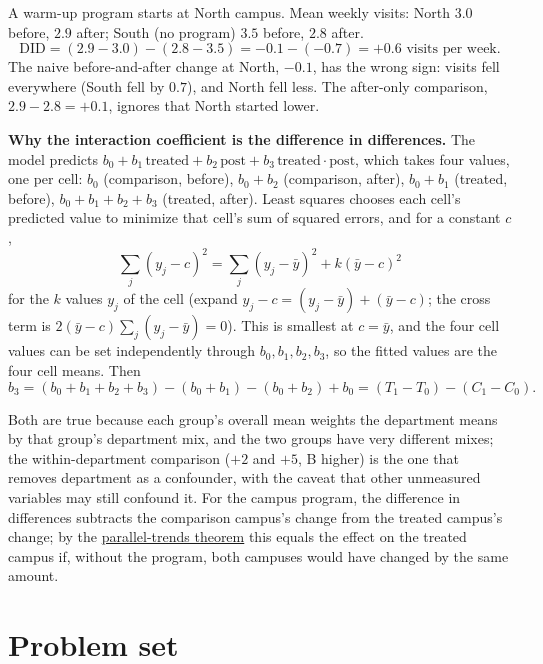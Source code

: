 \documentclass[10pt]{scrartcl}
\begin{document}
\begin{example*}
A warm-up program starts at North campus. Mean weekly visits: North $3.0$ before, $2.9$ after; South (no program) $3.5$ before, $2.8$ after.
\[
  \text{DID} = (2.9 - 3.0) - (2.8 - 3.5) = -0.1 - (-0.7) = +0.6 \text{ visits per week}.
\]
The naive before-and-after change at North, $-0.1$, has the wrong sign: visits fell everywhere (South fell by $0.7$), and North fell less. The after-only comparison, $2.9 - 2.8 = +0.1$, ignores that North started lower.
\end{example*}

\noindent\textbf{Why the interaction coefficient is the difference in differences.} The model  predicts $b_0 + b_1\,\text{treated} + b_2\,\text{post} + b_3\,\text{treated}\cdot\text{post}$, which takes four values, one per cell: $b_0$ (comparison, before), $b_0+b_2$ (comparison, after), $b_0+b_1$ (treated, before), $b_0+b_1+b_2+b_3$ (treated, after). Least squares chooses each cell's predicted value to minimize that cell's sum of squared errors, and for a constant $c$,
\[
  \sum_{j}(y_j - c)^2 = \sum_j (y_j - \bar y)^2 + k(\bar y - c)^2
\]
for the $k$ values $y_j$ of the cell (expand $y_j - c = (y_j - \bar y) + (\bar y - c)$; the cross term is $2(\bar y - c)\sum_j (y_j - \bar y) = 0$). This is smallest at $c = \bar y$, and the four cell values can be set independently through $b_0, b_1, b_2, b_3$, so the fitted values are the four cell means. Then
\[
  b_3 = (b_0+b_1+b_2+b_3) - (b_0+b_1) - (b_0+b_2) + b_0 = (T_1 - T_0) - (C_1 - C_0).
\]

\revisit Both are true because each group's overall mean weights the department means by that group's department mix, and the two groups have very different mixes; the within-department comparison ($+2$ and $+5$, B higher) is the one that removes department as a confounder, with the caveat that other unmeasured variables may still confound it. For the campus program, the difference in differences subtracts the comparison campus's change from the treated campus's change; by the \hyperref[thm-did]{parallel-trends theorem} this equals the effect on the treated campus if, without the program, both campuses would have changed by the same amount.

\section{Problem set}
\end{document}
